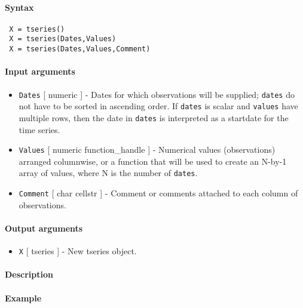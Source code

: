 


	\paragraph{Syntax}
 
 \begin{verbatim}
 X = tseries()
 X = tseries(Dates,Values)
 X = tseries(Dates,Values,Comment)
 \end{verbatim}
 
 \paragraph{Input arguments}
 
 \begin{itemize}
 \item
   \texttt{Dates} {[} numeric {]} - Dates for which observations will be
   supplied; \texttt{dates} do not have to be sorted in ascending order.
   If \texttt{dates} is scalar and \texttt{values} have multiple rows,
   then the date in \texttt{dates} is interpreted as a startdate for the
   time series.
 \item
   \texttt{Values} {[} numeric \textbar{} function\_handle {]} -
   Numerical values (observations) arranged columnwise, or a function
   that will be used to create an N-by-1 array of values, where N is the
   number of \texttt{dates}.
 \item
   \texttt{Comment} {[} char \textbar{} cellstr {]} - Comment or comments
   attached to each column of observations.
 \end{itemize}
 
 \paragraph{Output arguments}
 
 \begin{itemize}
 \item
   \texttt{X} {[} tseries {]} - New tseries object.
 \end{itemize}
 
 \paragraph{Description}
 
 \paragraph{Example}


